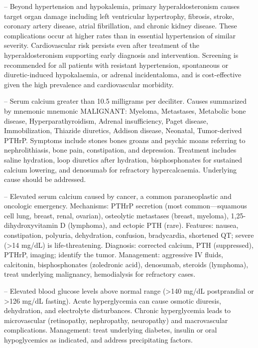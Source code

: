 -- Beyond hypertension and hypokalemia, primary hyperaldosteronism causes target organ damage including left ventricular hypertrophy, fibrosis, stroke, coronary artery disease, atrial fibrillation, and chronic kidney disease. These complications occur at higher rates than in essential hypertension of similar severity. Cardiovascular risk persists even after treatment of the hyperaldosteronism supporting early diagnosis and intervention. Screening is recommended for all patients with resistant hypertension, spontaneous or diuretic-induced hypokalaemia, or adrenal incidentaloma, and is cost-effective given the high prevalence and cardiovascular morbidity.

-- Serum calcium greater than 10.5 milligrams per deciliter. Causes summarized by mnemonic mnemonic MALIGNANT: Myeloma, Metastases, Metabolic bone disease, Hyperparathyroidism, Adrenal insufficiency, Paget disease, Immobilization, Thiazide diuretics, Addison disease, Neonatal, Tumor-derived PTHrP. Symptoms include stones bones groans and psychic moans referring to nephrolithiasis, bone pain, constipation, and depression. Treatment includes saline hydration, loop diuretics after hydration, bisphosphonates for sustained calcium lowering, and denosumab for refractory hypercalcaemia. Underlying cause should be addressed.

-- Elevated serum calcium caused by cancer, a common paraneoplastic and oncologic emergency. Mechanisms: PTHrP secretion (most common—squamous cell lung, breast, renal, ovarian), osteolytic metastases (breast, myeloma), 1,25-dihydroxyvitamin D (lymphoma), and ectopic PTH (rare). Features: nausea, constipation, polyuria, dehydration, confusion, bradycardia, shortened QT; severe (>14 mg/dL) is life-threatening. Diagnosis: corrected calcium, PTH (suppressed), PTHrP, imaging; identify the tumor. Management: aggressive IV fluids, calcitonin, bisphosphonates (zoledronic acid), denosumab, steroids (lymphoma), treat underlying malignancy, hemodialysis for refractory cases.

-- Elevated blood glucose levels above normal range (>140 mg/dL postprandial or >126 mg/dL fasting). Acute hyperglycemia can cause osmotic diuresis, dehydration, and electrolyte disturbances. Chronic hyperglycemia leads to microvascular (retinopathy, nephropathy, neuropathy) and macrovascular complications. Management: treat underlying diabetes, insulin or oral hypoglycemics as indicated, and address precipitating factors.

